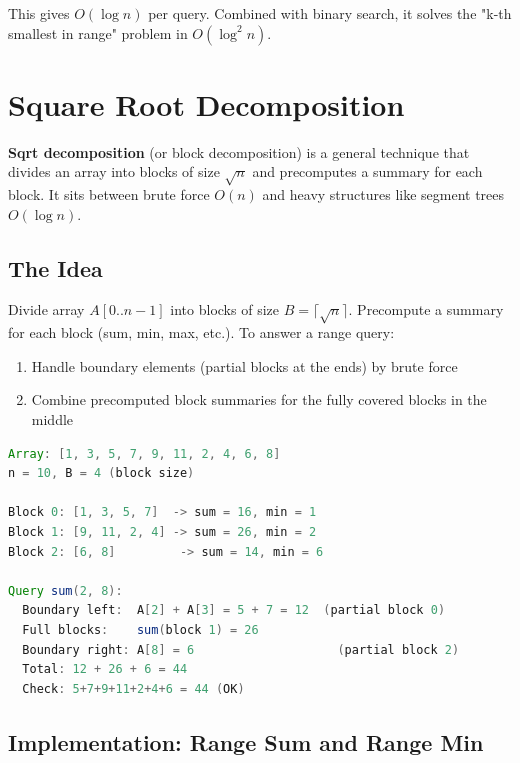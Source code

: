 This gives $O(\log n)$ per query. Combined with binary search, it solves the "k-th smallest in range" problem in $O(\log^2 n)$.

\section{Square Root Decomposition}

\textbf{Sqrt decomposition} (or block decomposition) is a general technique that divides an array into blocks of size $\sqrt{n}$ and precomputes a summary for each block. It sits between brute force $O(n)$ and heavy structures like segment trees $O(\log n)$.

\subsection{The Idea}

Divide array $A[0..n-1]$ into blocks of size $B = \lceil\sqrt{n}\rceil$. Precompute a summary for each block (sum, min, max, etc.). To answer a range query:
\begin{enumerate}
\item Handle boundary elements (partial blocks at the ends) by brute force
\item Combine precomputed block summaries for the fully covered blocks in the middle
\end{enumerate}

\begin{lstlisting}[language=Java]
Array: [1, 3, 5, 7, 9, 11, 2, 4, 6, 8]
n = 10, B = 4 (block size)

Block 0: [1, 3, 5, 7]  -> sum = 16, min = 1
Block 1: [9, 11, 2, 4] -> sum = 26, min = 2
Block 2: [6, 8]         -> sum = 14, min = 6

Query sum(2, 8):
  Boundary left:  A[2] + A[3] = 5 + 7 = 12  (partial block 0)
  Full blocks:    sum(block 1) = 26
  Boundary right: A[8] = 6                    (partial block 2)
  Total: 12 + 26 + 6 = 44
  Check: 5+7+9+11+2+4+6 = 44 (OK)
\end{lstlisting}

\subsection{Implementation: Range Sum and Range Min}

